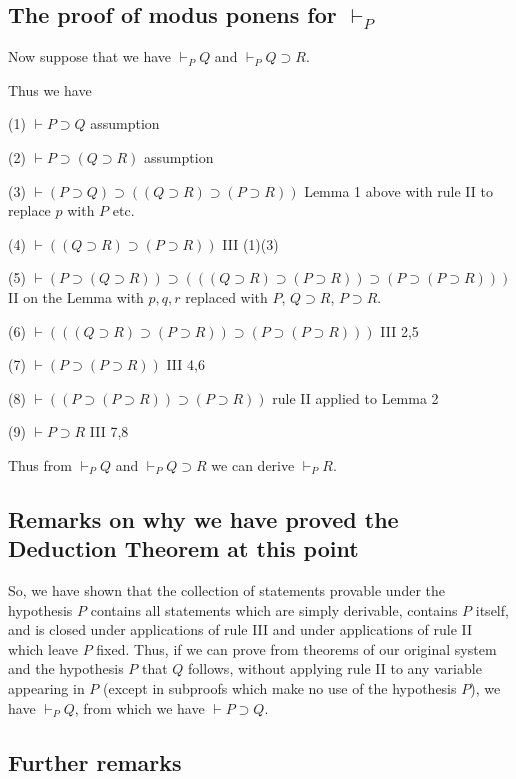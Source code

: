 \documentclass[12pt]{article}
\begin{document}
\subsection{The proof of modus ponens for $\vdash_P$}


Now suppose that we have $\vdash_PQ$ and $\vdash_PQ \supset R$.

Thus we have

(1) $\vdash P \supset Q$  assumption

(2) $\vdash P \supset (Q \supset R)$  assumption

(3) $\vdash (P \supset Q) \supset ((Q \supset R) \supset (P \supset R))$  Lemma 1 above with rule II to replace $p$ with $P$ etc.

(4) $\vdash ((Q \supset R) \supset (P \supset R))$ III (1)(3)

(5)  $\vdash (P \supset (Q \supset R)) \supset (((Q \supset R) \supset (P \supset R)) \supset (P \supset (P \supset R)))$  II on the Lemma with $p,q,r$ replaced with $P$, $Q \supset R$, $P \supset R$.

(6) $\vdash (((Q \supset R) \supset (P \supset R)) \supset (P \supset (P \supset R)))$  III 2,5

(7)  $\vdash (P \supset (P \supset R))$  III 4,6

(8) $\vdash ((P \supset (P \supset R)) \supset (P \supset R))$ rule II applied to Lemma 2

(9) $\vdash P \supset R$ III 7,8

Thus from $\vdash_P Q$ and $\vdash_P Q \supset R$ we can derive $\vdash_PR$.

\subsection{Remarks on why we have proved the Deduction Theorem at this point}

So, we have shown that the collection of statements provable under the hypothesis $P$ contains all statements which are simply derivable,
contains $P$ itself, and is closed under applications of rule III and under applications of rule II which leave $P$ fixed.  Thus, if we can prove from
theorems of our original system and the hypothesis $P$ that $Q$ follows, without applying rule II to any variable appearing in $P$ (except in subproofs which make no use of the hypothesis $P$), we have $\vdash_P Q$, from which we have $\vdash P \supset Q$.

\subsection{Further remarks}
\end{document}
